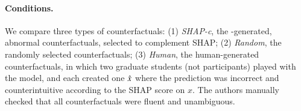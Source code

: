 

\newcommand{\cshap}{\emph{SHAP-c}\xspace}
\newcommand{\crandom}{\emph{Random}\xspace}
\newcommand{\chuman}{\emph{Human}\xspace}
\paragraph{Conditions.} 
We compare three types of counterfactuals:
(1) \cshap, the \sysname-generated, abnormal counterfactuals, selected to complement SHAP; 
(2) \crandom, the randomly selected \sysname counterfactuals; 
(3) \chuman, the human-generated counterfactuals, in which two graduate students (not participants) played with the model, and each created one $\hat{x}$ where the prediction was incorrect and counterintuitive according to the SHAP score on $x$.
The authors manually checked that all counterfactuals were fluent and unambiguous.

